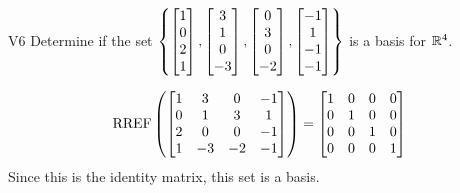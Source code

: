 \begin{problem}{V6}
Determine if the set
\(\left\{
  \begin{bmatrix} 1 \\ 0 \\ 2 \\1 \end{bmatrix},
  \begin{bmatrix} 3 \\ 1 \\ 0 \\ -3 \end{bmatrix},
  \begin{bmatrix} 0 \\ 3 \\ 0 \\ -2 \end{bmatrix},
  \begin{bmatrix}-1 \\ 1 \\ -1 \\ -1 \end{bmatrix}
\right\}\) is a basis for \(\mathbb{R}^4\).
\end{problem}
\begin{solution}
\[\operatorname{RREF}\left(\begin{bmatrix}1 & 3 & 0 & -1 \\ 0 & 1 & 3 & 1 \\ 2 & 0 & 0 & -1 \\ 1 & -3 & -2 & -1 \end{bmatrix} \right) =\begin{bmatrix} 1 & 0 & 0 & 0 \\ 0 & 1 & 0 & 0 \\ 0 & 0 & 1 & 0 \\ 0 & 0 & 0 & 1 \end{bmatrix}\]
Since this is the identity matrix, this set is a basis.
\end{solution}
